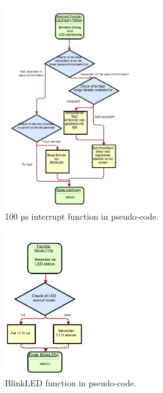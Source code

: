 \documentclass[a4paper,dutch]{article}
\begin{document}
\begin{appendices}
\begin{figure}[H]
\centering
\includegraphics[width=0.5\textwidth]{Interrupt.png}
\caption{\label{fig:interrupt}100 µs interrupt function in pseudo-code.}
\end{figure}

\begin{figure}[H]
\centering
\includegraphics[width=0.3\textwidth]{blinkLED.png}
\caption{\label{fig:blinkled}BlinkLED function in pseudo-code.}
\end{figure}

\pagebreak


\end{appendices}
\end{document}
